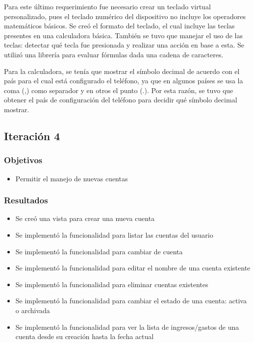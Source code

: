 Para este último requerimiento fue necesario crear un teclado virtual personalizado, pues el teclado numérico del dispositivo no incluye los operadores matemáticos básicos. Se creó el formato del teclado, el cual incluye las teclas presentes en una calculadora básica. También se tuvo que manejar el uso de las teclas: detectar qué tecla fue presionada y realizar una acción en base a esta. Se utilizó una librería para evaluar fórmulas dada una cadena de caracteres.

Para la calculadora, se tenía que mostrar el símbolo decimal de acuerdo con el país para el cual está configurado el teléfono, ya que en algunos países se usa la coma (,) como separador y en otros el punto (.). Por esta razón, se tuvo que obtener el país de configuración del teléfono para decidir qué símbolo decimal mostrar.

\subsection{Iteración 4}
\subsubsection{Objetivos}
\begin{itemize}
\item Permitir el manejo de nuevas cuentas
\end{itemize}

\subsubsection{Resultados}
\begin{itemize}

\item Se creó una vista para crear una nueva cuenta
\item Se implementó la funcionalidad para listar las cuentas del usuario 
\item Se implementó la funcionalidad para cambiar de cuenta
\item Se implementó la funcionalidad para editar el nombre de una cuenta existente
\item Se implementó la funcionalidad para eliminar cuentas existentes
\item Se implementó la funcionalidad para cambiar el estado de una cuenta: activa o archivada
\item Se implementó la funcionalidad para ver la lista de ingresos/gastos de una cuenta desde su creación hasta la fecha actual

\end{itemize}

